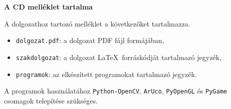 \pagestyle{empty}

\noindent \textbf{\Large A CD melléklet tartalma}

\vskip 1cm

\noindent A dolgozathoz tartozó melléklet a következőket tartalmazza.

\begin{itemize}
\item \texttt{dolgozat.pdf}: a dolgozat PDF fájl formájában,
\item \texttt{szakdolgozat}: a dolgozat \LaTeX\ forráskódját tartalmazó jegyzék,
\item \texttt{programok}: az elkészített programokat tartalmazó jegyzék.
\end{itemize}
A programok használatához \texttt{Python-OpenCV}, \texttt{ArUco}, \texttt{PyOpenGL} és \texttt{PyGame} csomagok telepítése szükséges.
